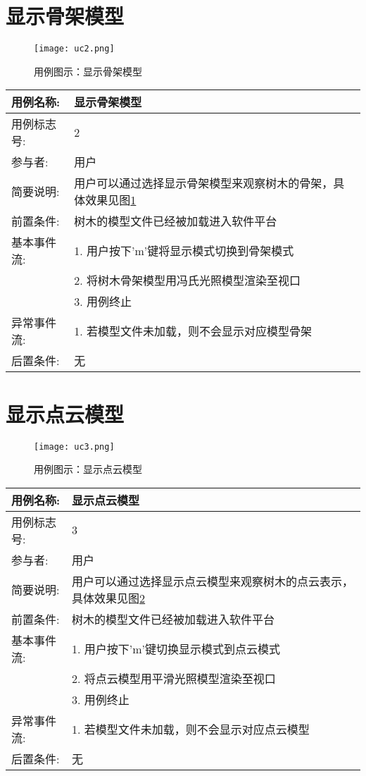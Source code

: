 \clearpage
\section{显示骨架模型}
\begin{figure}[H]
	\centering
	\texttt{[image: uc2.png]}
	\caption{用例图示：显示骨架模型}
	\label{fig:uc2}
\end{figure}

\begin{table}[H]
	\centering
\begin{tabular}{|l|p{8cm}|}
	\hline
	用例名称: & 显示骨架模型\\
	\hline
	用例标志号: & 2\\
	\hline
	参与者: & 用户\\
	\hline
	简要说明: & 用户可以通过选择显示骨架模型来观察树木的骨架，具体效果见图\ref{fig:uc2}\\
	\hline
	前置条件: & 树木的模型文件已经被加载进入软件平台\\
	\hline
	基本事件流: & 1. 用户按下'm'键将显示模式切换到骨架模式\\
	 & 2. 将树木骨架模型用冯氏光照模型渲染至视口\\
	 & 3. 用例终止\\
	\hline
	异常事件流: & 1. 若模型文件未加载，则不会显示对应模型骨架\\
	\hline
	后置条件: & 无\\
	\hline
\end{tabular}
\end{table}

\clearpage
\section{显示点云模型}
\begin{figure}[H]
	\centering
	\texttt{[image: uc3.png]}
	\caption{用例图示：显示点云模型}
	\label{fig:uc3}
\end{figure}

\begin{table}[H]
	\centering
\begin{tabular}{|l|p{8cm}|}
	\hline
	用例名称: & 显示点云模型\\
	\hline
	用例标志号: & 3\\
	\hline
	参与者: & 用户\\
	\hline
	简要说明: & 用户可以通过选择显示点云模型来观察树木的点云表示，具体效果见图\ref{fig:uc3}\\
	\hline
	前置条件: & 树木的模型文件已经被加载进入软件平台\\
	\hline
	基本事件流: & 1. 用户按下'm'键切换显示模式到点云模式\\
	 & 2. 将点云模型用平滑光照模型渲染至视口\\
	 & 3. 用例终止\\
	\hline
	异常事件流: & 1. 若模型文件未加载，则不会显示对应点云模型\\
	\hline
	后置条件: & 无\\
	\hline
\end{tabular}
\end{table}

